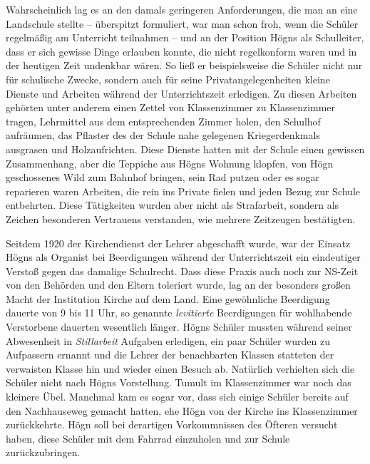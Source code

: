 \documentclass{book}
\begin{document}
Wahrscheinlich lag es an den damals geringeren Anforderungen, die man an
eine Landschule stellte – überspitzt formuliert, war man schon froh,
wenn die Schüler regelmäßig am Unterricht teilnahmen – und an der
Position Högns als Schulleiter, dass er sich gewisse Dinge erlauben
konnte, die nicht regelkonform waren und in der heutigen Zeit undenkbar
wären. So ließ er bei\-spielsweise die Schüler nicht nur für schulische
Zwecke, sondern auch für sei\-ne Privatangelegenheiten kleine Dienste
und Arbeiten während der Unter\-richtszeit erledigen. Zu diesen
Arbeiten gehörten unter anderem einen Zettel von Klassenzimmer zu
Klassenzimmer tragen, Lehrmittel aus dem entspre\-chenden Zimmer holen,
den Schulhof aufräumen, das Pflaster des der Schule nahe gelegenen
Kriegerdenkmals ausgrasen und Holzaufrichten. Diese Dienste hatten mit
der Schule einen gewissen Zusammenhang, aber die Teppiche aus Högns
Wohnung klopfen, von Högn geschossenes Wild zum Bahnhof brin\-gen, sein
Rad putzen oder es sogar reparieren waren Arbeiten, die rein ins
Private fielen und jeden Bezug zur Schule entbehrten. Diese Tätigkeiten
wur\-den aber nicht als Strafarbeit, sondern als Zeichen besonderen
Vertrauens ver\-standen, wie mehrere Zeitzeugen bestätigten.


Seitdem 1920 der Kirchendienst der Lehrer abgeschafft wurde, war der
Einsatz Högns als Organist bei Beerdigungen während der Unterrichtszeit
ein eindeutiger Verstoß gegen das damalige Schulrecht. Dass diese
Praxis auch noch zur NS-Zeit von den Behörden und den Eltern toleriert
wurde, lag an der besonders großen Macht der Institution Kirche auf dem
Land. Eine ge\-wöhnliche Beerdigung dauerte von 9 bis 11 Uhr, so
genannte \textit{levitierte} Be\-erdigungen für wohlhabende Verstorbene
dauerten wesentlich länger. Högns Schüler mussten während seiner
Abwesenheit in \textit{Stillarbeit} Aufgaben erledi\-gen, ein paar
Schüler wurden zu Aufpassern ernannt und die Lehrer der be\-nachbarten
Klassen statteten der verwaisten Klasse hin und wieder einen Be\-such
ab. Natürlich verhielten sich die Schüler nicht nach Högns Vorstellung.
Tumult im Klassenzimmer war noch das kleinere Übel. Manchmal kam es
so\-gar vor, dass sich einige Schüler bereits auf den Nachhauseweg
gemacht hatten, ehe Högn von der Kirche ins Klassenzimmer zurückkehrte.
Högn soll bei derartigen Vorkommnissen des Öfteren versucht haben,
diese Schüler mit dem Fahrrad einzuholen und zur Schule
zurückzubringen.
\end{document}
